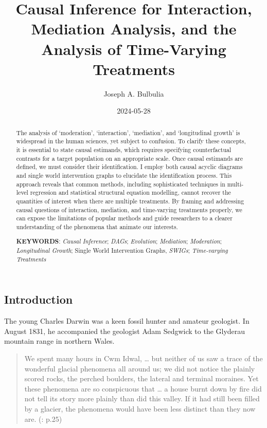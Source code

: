 \documentclass[
  single column]{article}
\title{Causal Inference for Interaction, Mediation Analysis, and the
Analysis of Time-Varying Treatments}
\author{Joseph A. Bulbulia}
\affil{%
             \small{     Victoria University of Wellington, New Zealand
          ORCID \textcolor[HTML]{A6CE39}{\aiOrcid} ~0000-0002-5861-2056 }
              }
\date{2024-05-28}
\begin{document}
\maketitle
\begin{abstract}
The analysis of `moderation', `interaction', `mediation', and
`longitudinal growth' is widespread in the human sciences, yet subject
to confusion. To clarify these concepts, it is essential to state causal
estimands, which requires specifying counterfactual contrasts for a
target population on an appropriate scale. Once causal estimands are
defined, we must consider their identification. I employ both causal
acyclic diagrams and single world intervention graphs to elucidate the
identification process. This approach reveals that common methods,
including sophisticated techniques in multi-level regression and
statistical structural equation modelling, cannot recover the quantities
of interest when there are multiple treatments. By framing and
addressing causal questions of interaction, mediation, and time-varying
treatments properly, we can expose the limitations of popular methods
and guide researchers to a clearer understanding of the phenomena that
animate our interests.

\textbf{KEYWORDS}: \emph{Causal Inference}; \emph{DAGs};
\emph{Evolution}; \emph{Mediation}; \emph{Moderation};
\emph{Longitudinal Growth}; Single World Intervention Graphs,
\emph{SWIGs}; \emph{Time-varying Treatments}
\end{abstract}

\subsection{Introduction}\label{id-introduction}

The young Charles Darwin was a keen fossil hunter and amateur geologist.
In August 1831, he accompanied the geologist Adam Sedgwick to the
Glyderau mountain range in northern Wales.

\begin{quote}
We spent many hours in Cwm Idwal, \ldots{} but neither of us saw a trace
of the wonderful glacial phenomena all around us; we did not notice the
plainly scored rocks, the perched boulders, the lateral and terminal
moraines. Yet these phenomena are so conspicuous that \ldots{} a house
burnt down by fire did not tell its story more plainly than did this
valley. If it had still been filled by a glacier, the phenomena would
have been less distinct than they now are.
(: p.25)
\end{quote}
\end{document}
